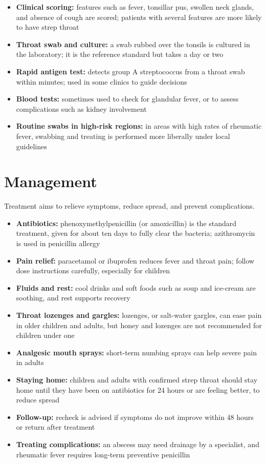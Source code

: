 \begin{itemize}
    \item \textbf{Clinical scoring:} features such as fever, tonsillar pus, swollen neck glands, and absence of cough are scored; patients with several features are more likely to have strep throat
    \item \textbf{Throat swab and culture:} a swab rubbed over the tonsils is cultured in the laboratory; it is the reference standard but takes a day or two
    \item \textbf{Rapid antigen test:} detects group A streptococcus from a throat swab within minutes; used in some clinics to guide decisions
    \item \textbf{Blood tests:} sometimes used to check for glandular fever, or to assess complications such as kidney involvement
    \item \textbf{Routine swabs in high-risk regions:} in areas with high rates of rheumatic fever, swabbing and treating is performed more liberally under local guidelines
\end{itemize}

\section*{Management}
Treatment aims to relieve symptoms, reduce spread, and prevent complications.

\begin{itemize}
    \item \textbf{Antibiotics:} phenoxymethylpenicillin (or amoxicillin) is the standard treatment, given for about ten days to fully clear the bacteria; azithromycin is used in penicillin allergy
    \item \textbf{Pain relief:} paracetamol or ibuprofen reduces fever and throat pain; follow dose instructions carefully, especially for children
    \item \textbf{Fluids and rest:} cool drinks and soft foods such as soup and ice-cream are soothing, and rest supports recovery
    \item \textbf{Throat lozenges and gargles:} lozenges, or salt-water gargles, can ease pain in older children and adults, but honey and lozenges are not recommended for children under one
    \item \textbf{Analgesic mouth sprays:} short-term numbing sprays can help severe pain in adults
    \item \textbf{Staying home:} children and adults with confirmed strep throat should stay home until they have been on antibiotics for 24 hours or are feeling better, to reduce spread
    \item \textbf{Follow-up:} recheck is advised if symptoms do not improve within 48 hours or return after treatment
    \item \textbf{Treating complications:} an abscess may need drainage by a specialist, and rheumatic fever requires long-term preventive penicillin
\end{itemize}

